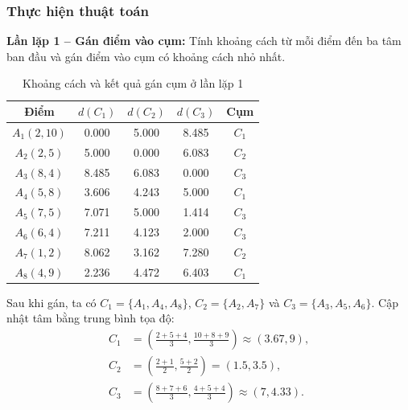 \subsubsection*{Thực hiện thuật toán}
\textbf{Lần lặp 1 -- Gán điểm vào cụm:} Tính khoảng cách từ mỗi điểm đến ba tâm ban đầu và gán điểm vào cụm có khoảng cách nhỏ nhất.
\begin{table}[H]
    \centering
    \small
    \begin{tabular}{|c|c|c|c|c|}
        \hline
        \textbf{Điểm} & \textbf{$d(C_1)$} & \textbf{$d(C_2)$} & \textbf{$d(C_3)$} & \textbf{Cụm} \\
        \hline
        $A_1(2,10)$ & 0.000 & 5.000 & 8.485 & $C_1$ \\ \hline
        $A_2(2,5)$ & 5.000 & 0.000 & 6.083 & $C_2$ \\ \hline
        $A_3(8,4)$ & 8.485 & 6.083 & 0.000 & $C_3$ \\ \hline
        $A_4(5,8)$ & 3.606 & 4.243 & 5.000 & $C_1$ \\ \hline
        $A_5(7,5)$ & 7.071 & 5.000 & 1.414 & $C_3$ \\ \hline
        $A_6(6,4)$ & 7.211 & 4.123 & 2.000 & $C_3$ \\ \hline
        $A_7(1,2)$ & 8.062 & 3.162 & 7.280 & $C_2$ \\ \hline
        $A_8(4,9)$ & 2.236 & 4.472 & 6.403 & $C_1$ \\ \hline
    \end{tabular}
    \caption{Khoảng cách và kết quả gán cụm ở lần lặp 1}
    \label{tab:kmeans-iteration-1}
\end{table}

Sau khi gán, ta có $C_1=\{A_1,A_4,A_8\}$, $C_2=\{A_2,A_7\}$ và $C_3=\{A_3,A_5,A_6\}$. Cập nhật tâm bằng trung bình tọa độ:
\begin{align*}
C_1&=\left(\frac{2+5+4}{3},\frac{10+8+9}{3}\right)\approx(3.67,9),\\
C_2&=\left(\frac{2+1}{2},\frac{5+2}{2}\right)=(1.5,3.5),\\
C_3&=\left(\frac{8+7+6}{3},\frac{4+5+4}{3}\right)\approx(7,4.33).
\end{align*}

